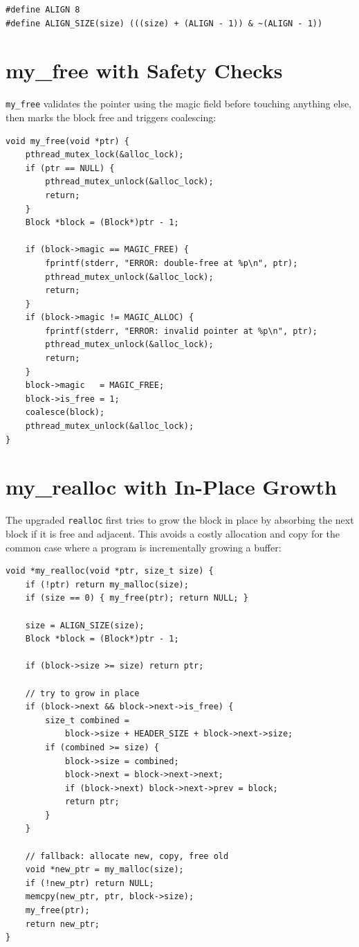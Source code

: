 \documentclass[12pt, a4paper]{report}
\begin{document}
\begin{lstlisting}
#define ALIGN 8
#define ALIGN_SIZE(size) (((size) + (ALIGN - 1)) & ~(ALIGN - 1))
\end{lstlisting}

\section{my\_free with Safety Checks}

\texttt{my\_free} validates the pointer using the magic field before touching
anything else, then marks the block free and triggers coalescing:

\begin{lstlisting}
void my_free(void *ptr) {
    pthread_mutex_lock(&alloc_lock);
    if (ptr == NULL) {
        pthread_mutex_unlock(&alloc_lock);
        return;
    }
    Block *block = (Block*)ptr - 1;

    if (block->magic == MAGIC_FREE) {
        fprintf(stderr, "ERROR: double-free at %p\n", ptr);
        pthread_mutex_unlock(&alloc_lock);
        return;
    }
    if (block->magic != MAGIC_ALLOC) {
        fprintf(stderr, "ERROR: invalid pointer at %p\n", ptr);
        pthread_mutex_unlock(&alloc_lock);
        return;
    }
    block->magic   = MAGIC_FREE;
    block->is_free = 1;
    coalesce(block);
    pthread_mutex_unlock(&alloc_lock);
}
\end{lstlisting}

\section{my\_realloc with In-Place Growth}

The upgraded \texttt{realloc} first tries to grow the block in place by
absorbing the next block if it is free and adjacent. This avoids a costly
allocation and copy for the common case where a program is incrementally growing
a buffer:

\begin{lstlisting}
void *my_realloc(void *ptr, size_t size) {
    if (!ptr) return my_malloc(size);
    if (size == 0) { my_free(ptr); return NULL; }

    size = ALIGN_SIZE(size);
    Block *block = (Block*)ptr - 1;

    if (block->size >= size) return ptr;

    // try to grow in place
    if (block->next && block->next->is_free) {
        size_t combined =
            block->size + HEADER_SIZE + block->next->size;
        if (combined >= size) {
            block->size = combined;
            block->next = block->next->next;
            if (block->next) block->next->prev = block;
            return ptr;
        }
    }

    // fallback: allocate new, copy, free old
    void *new_ptr = my_malloc(size);
    if (!new_ptr) return NULL;
    memcpy(new_ptr, ptr, block->size);
    my_free(ptr);
    return new_ptr;
}
\end{lstlisting}
\end{document}
